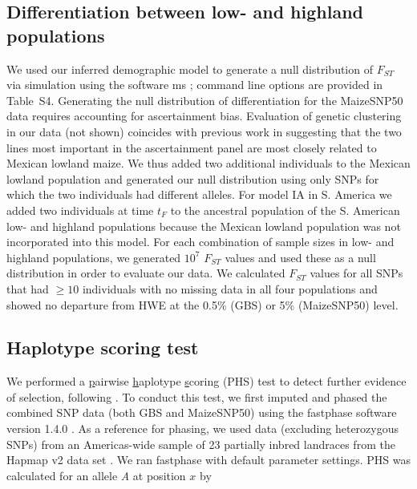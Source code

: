 \subsection*{Differentiation between low- and highland populations}
We used our inferred demographic model to generate a null distribution of $F_{ST}$ via simulation using the software {\sf ms} \cite[]{Hudson_2002_11847089}; command line options are provided in Table~S4.  
Generating the null distribution of differentiation for the MaizeSNP50 data requires accounting for ascertainment bias. 
Evaluation of genetic clustering in our data (not shown) coincides with previous work \cite[]{Hufford_2012_22660546} in suggesting that the two lines most important in the ascertainment panel are most closely related to Mexican lowland maize.  
We thus added two additional individuals to the Mexican lowland population and generated our null distribution using only SNPs for which the two individuals had different alleles. For model IA in S. America we added two individuals at time $t_F$ to the ancestral population of the S. American low- and highland populations because the Mexican lowland population was not incorporated into this model. 
For each combination of sample sizes in low- and highland populations, we generated $10^7$ $F_{ST}$ values and used these as a null distribution in order to evaluate our data.   
We calculated $F_{ST}$ values for all SNPs that had $\geq10$ individuals with no missing data in all four populations and showed no departure from HWE at the 0.5\% (GBS) or 5\% (MaizeSNP50) level. 

\subsection*{Haplotype scoring test}
We performed a \underline{p}airwise \underline{h}aplotype \underline{s}coring (PHS) test to detect further evidence of selection, following \cite{Toomajian_2006_16623598}.  
To conduct this test, we first imputed and phased the combined SNP data (both GBS and MaizeSNP50) using the {\sf fastphase} software version 1.4.0 \cite[]{Scheet_2006_16532393}.  
As a reference for phasing, we used data (excluding heterozygous SNPs) from an Americas-wide sample of 23 partially inbred landraces from the Hapmap v2 data set  \cite[]{Chia_2012_22660545}.  
We ran {\sf fastphase}  with default parameter settings.  
PHS was calculated for an allele \emph{A} at position $x$ by

